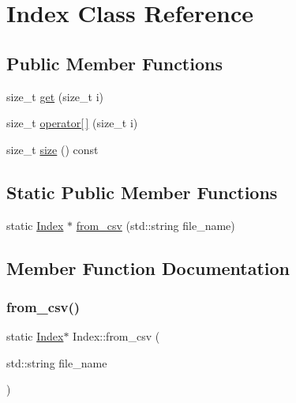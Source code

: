 \hypertarget{class_index}{}\section{Index Class Reference}
\label{class_index}
\subsection*{Public Member Functions}
\begin{DoxyCompactItemize}
\item 
size\+\_\+t \hyperlink{class_index_a83ff6cc2f792e8d264ba1f56439cf505}{get} (size\+\_\+t i)
\item 
size\+\_\+t \hyperlink{class_index_a9ccd3ac197c7a463064c22515e77bfe1}{operator\mbox{[}$\,$\mbox{]}} (size\+\_\+t i)
\item 
size\+\_\+t \hyperlink{class_index_ad125463c2df0e7af560698384dd5924b}{size} () const
\end{DoxyCompactItemize}
\subsection*{Static Public Member Functions}
\begin{DoxyCompactItemize}
\item 
static \hyperlink{class_index}{Index} $\ast$ \hyperlink{class_index_a70ac4ffaa3f1a4144a019ab3f3885330}{from\+\_\+csv} (std\+::string file\+\_\+name)
\end{DoxyCompactItemize}


\subsection{Member Function Documentation}
\mbox{\label{class_index_a70ac4ffaa3f1a4144a019ab3f3885330}} 
\subsubsection{\texorpdfstring{from\+\_\+csv()}{from\_csv()}}
{\footnotesize\ttfamily static \hyperlink{class_index}{Index}$\ast$ Index\+::from\+\_\+csv (\begin{DoxyParamCaption}\item[{std\+::string}]{file\+\_\+name }\end{DoxyParamCaption})\hspace{0.3cm}{\ttfamily [static]}}

